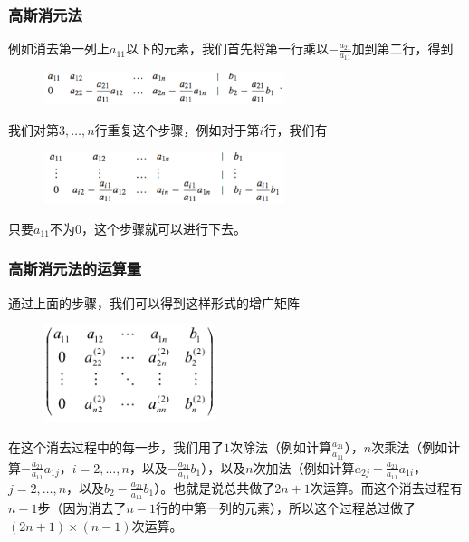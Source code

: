 \documentclass[10pt]{beamer}
\begin{document}
\begin{frame}
\frametitle{高斯消元法}
例如消去第一列上$a_{11}$以下的元素，我们首先将第一行乘以$-\frac{a_{21}}{a_{11}}$加到第二行，得到
\begin{figure}
\includegraphics[width=7cm]{figs/2_1_2_Gaussian_Elimi_Augmented-2} 
\end{figure}
我们对第$3, \ldots, n$行重复这个步骤，例如对于第$i$行，我们有
\begin{figure}
\includegraphics[width=7cm]{figs/2_1_2_Gaussian_Elimi_Augmented-3} 
\end{figure}
只要$a_{11}$不为$0$，这个步骤就可以进行下去。
\end{frame}


\begin{frame}
\frametitle{高斯消元法的运算量}
通过上面的步骤，我们可以得到这样形式的增广矩阵
\begin{figure}
\includegraphics[width=5cm]{figs/2_1_2_Gaussian_Elimi_Augmented-4} 
\end{figure}
在这个消去过程中的每一步，我们用了$1$次除法（例如计算$\frac{a_{21}}{a_{11}}$），$n$次乘法（例如计算$-\frac{a_{21}}{a_{11}} a_{1j}$，$i = 2, \ldots, n$，以及$-\frac{a_{21}}{a_{11}} b_1$），以及$n$次加法（例如计算$a_{2j} - \frac{a_{21}}{a_{11}} a_{1i}$，$j = 2, \ldots, n$，以及$b_2-\frac{a_{21}}{a_{11}} b_1$）。也就是说总共做了$2n+1$次运算。而这个消去过程有$n-1$步（因为消去了$n-1$行的中第一列的元素），所以这个过程总过做了$(2n+1) \times (n-1)$次运算。
\end{frame}
\end{document}
